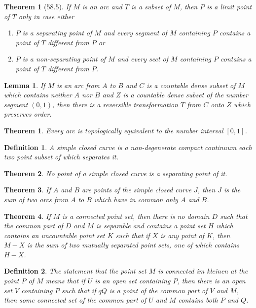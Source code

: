 \documentclass[10pt]{report}
\newtheorem{theorem}{Theorem}
\newtheorem*{theorem*}{Theorem}
\newtheorem{definition}{Definition}
\newtheorem*{lemma}{Lemma}
\begin{document}
\begin{theorem*}[58.5]
 If $M$ is an arc and $T$ is a subset of $M$, then $P$ is a limit point of $T$ only in case either
 \begin{enumerate}
  \item $P$ is a separating point of $M$ and every segment of $M$ containing $P$ contains a point of $T$ different from
$P$ or
  \item $P$ is a non-separating point of $M$ and every sect of $M$ containing $P$ contains a point of $T$ different
from $P$.
 \end{enumerate}
\end{theorem*}

\begin{lemma}
 If $M$ is an arc from $A$ to $B$ and $C$ is a countable dense subset of $M$ which contains neither $A$ nor $B$ and $Z$
is a countable dense subset of the number segment $(0,1)$, then there is a reversible transformation $T$ from $C$ onto
$Z$ which preserves order.
\end{lemma}

\begin{theorem}
 Every arc is topologically equivalent to the number interval $[0,1]$.
\end{theorem}

\begin{definition}
 A simple closed curve is a non-degenerate compact continuum each two point subset of which separates it.
\end{definition}

\begin{theorem}
 No point of a simple closed curve is a separating point of it.
\end{theorem}

\begin{theorem}
 If $A$ and $B$ are points of the simple closed curve $J$, then $J$ is the sum of two arcs from $A$ to $B$ which have in
common only $A$ and $B$.
\end{theorem}

\begin{theorem}
 If $M$ is a connected point set, then there is no domain $D$ such that the common part of $D$ and $M$ is separable and
contains a point set $H$ which contains an uncountable point set $K$ such that if $X$ is any point of $K$, then $M-X$ is
the sum of two mutually separated point sets, one of which contains $H-X$.
\end{theorem}

\begin{definition}
 The statement that the point set $M$ is connected im kleinen at the point $P$ of $M$ means that if $U$ is an open set
containing $P$, then there is an open set $V$ containing $P$ such that if $qQ$ is a point of the common part of $V$ and
$M$, then some connected set of the common part of $U$ and $M$ contains both $P$ and $Q$.
\end{definition}
\end{document}
